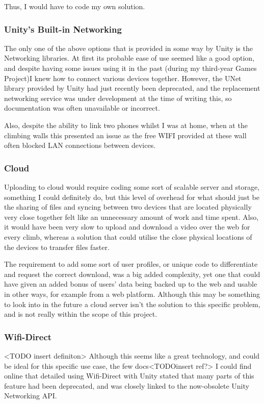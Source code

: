 Thus, I would have to code my own solution.


\subsubsection{Unity's Built-in Networking}
The only one of the above options that is provided in some way by Unity is the Networking libraries.
At first its probable ease of use seemed like a good option, and despite having some issues using it in the past (during my third-year Games Project)I knew how to connect various devices together.
However, the UNet library provided by Unity had just recently been deprecated, and the replacement networking service was under development at the time of writing this, so documentation was often unavailable or incorrect.

Also, despite the ability to link two phones whilst I was at home, when at the climbing walls this presented an issue as the free WIFI provided at these wall often blocked LAN connections between devices.

\subsubsection{Cloud}
Uploading to cloud would require coding some sort of scalable server and storage, something I could definitely do, but this level of overhead for what should just be the sharing of files and syncing between two devices that are located physically very close together felt like an unnecessary amount of work and time spent.
Also, it would have been very slow to upload and download a video over the web for every climb, whereas a solution that could utilise the close physical locations of the devices to transfer files faster.

The requirement to add some sort of user profiles, or unique code to differentiate and request the correct download, was a big added complexity, yet one that could have given an added bonus of users' data being backed up to the web and usable in other ways, for example from a web platform.
Although this may be something to look into in the future a cloud server isn't the solution to this specific problem, and is not really within the scope of this project.

\subsubsection{Wifi-Direct}
<TODO insert definiton>
Although this seems like a great technology, and could be ideal for this specific use case, the few docs<TODOinsert ref?> I could find online that detailed using Wifi-Direct with Unity stated that many parts of this feature had been deprecated, and was closely linked to the now-obsolete Unity Networking API.



